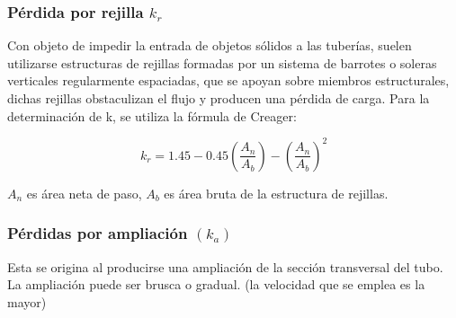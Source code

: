 \subsubsection{Pérdida por rejilla $k_r$}
Con objeto de impedir la entrada de objetos sólidos a las tuberías, suelen utilizarse estructuras de rejillas formadas por un sistema de barrotes o soleras verticales regularmente espaciadas, que se apoyan sobre miembros estructurales, dichas rejillas obstaculizan el flujo y producen una pérdida de carga. Para la determinación de k, se utiliza la fórmula de Creager:

\begin{equation}
    k_r =1.45 -0.45\left(\frac{A_n}{A_b}\right) -\left(\frac{A_n}{A_b}\right)^2
\end{equation}

$A_n$ es área neta de paso, $A_b$ es área bruta de la estructura de rejillas.

\subsubsection{Pérdidas por ampliación $(k_a)$}
Esta se origina al producirse una ampliación de la sección transversal del tubo. La ampliación puede ser brusca o gradual. (la velocidad que se emplea es la mayor)

